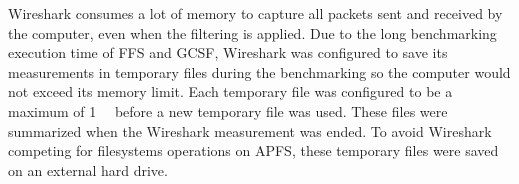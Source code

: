Wireshark consumes a lot of memory to capture all packets sent and received by the computer, even when the filtering is applied. Due to the long benchmarking execution time of \gls{FFS} and \gls{GCSF}, Wireshark was configured to save its measurements in temporary files during the benchmarking so the computer would not exceed its memory limit. Each temporary file was configured to be a maximum of \SI{1}{\giga\byte} before a new temporary file was used. These files were summarized when the Wireshark measurement was ended. To avoid Wireshark competing for filesystems operations on \gls{APFS}, these temporary files were saved on an external hard drive.

